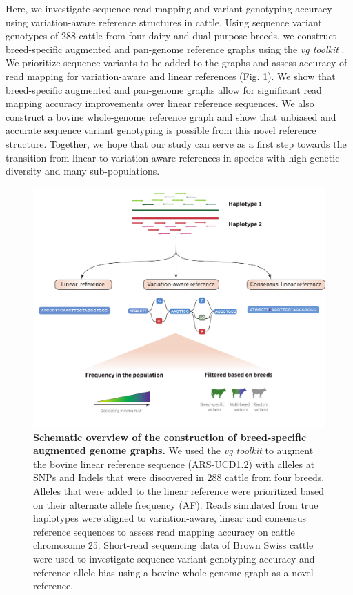 \documentclass[../main.tex]{subfiles}
\begin{document}
Here, we investigate sequence read mapping and variant genotyping accuracy using variation-aware reference structures in cattle. Using sequence variant genotypes of 288 cattle from four dairy and dual-purpose breeds, we construct breed-specific augmented and pan-genome reference graphs using the \emph{vg toolkit} \citep{garrison2018variation}. We prioritize sequence variants to be added to the graphs and assess accuracy of read mapping for variation-aware and linear references (Fig. \ref{fig31:pipe}). We show that breed-specific augmented and pan-genome graphs allow for significant read mapping accuracy improvements over linear reference sequences. We also construct a bovine whole-genome reference graph and show that unbiased and accurate sequence variant genotyping is possible from this novel reference structure. Together, we hope that our study can serve as a first step towards the transition from linear to variation-aware references in species with high genetic diversity and many sub-populations.

\begin{figure}[!htb]
    \centering
    \includegraphics[width=\textwidth]{paper2/main_figure/Fig1.pdf}
    \caption[Study scheme]{\textbf{Schematic overview of the construction of breed-specific augmented genome graphs.} 
    \small{We used the \emph{vg toolkit} to augment the bovine linear reference sequence (ARS-UCD1.2) with alleles at SNPs and Indels that were discovered in 288 cattle from four breeds. Alleles that were added to the linear reference were prioritized based on their alternate allele frequency (AF). Reads simulated from true haplotypes were aligned to variation-aware, linear and consensus reference sequences to assess read mapping accuracy on cattle chromosome 25. Short-read sequencing data of Brown Swiss cattle were used to investigate sequence variant genotyping accuracy and reference allele bias using a bovine whole-genome graph as a novel reference.}}
    \label{fig31:pipe}
\end{figure}
\end{document}
